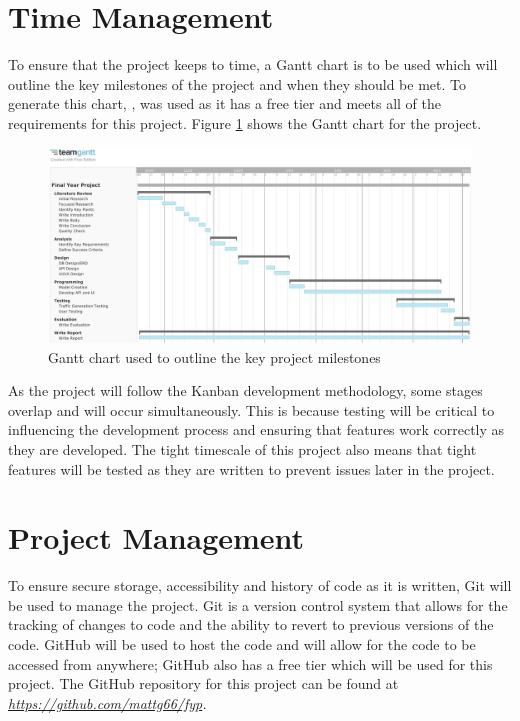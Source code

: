 \section{Time Management}
\label{methodology:time-management}
To ensure that the project keeps to time, a Gantt chart is to be used which will outline the key milestones of the project and when they should be met. To generate this chart, \citep{teamgantt}, was used as it has a free tier and meets all of the requirements for this project. Figure \ref{fig:gantt-chart} shows the Gantt chart for the project.
\begin{figure}[H]
    \centering
    \includegraphics[scale=0.2]{images/gantt-chart.png}
    \caption{Gantt chart used to outline the key project milestones}
    \label{fig:gantt-chart}
\end{figure}
As the project will follow the Kanban development methodology, some stages overlap and will occur simultaneously. This is because testing will be critical to influencing the development process and ensuring that features work correctly as they are developed. The tight timescale of this project also means that tight features will be tested as they are written to prevent issues later in the project.
\section{Project Management}
\label{methodology:project-management}
To ensure secure storage, accessibility and history of code as it is written, Git will be used to manage the project. Git is a version control system that allows for the tracking of changes to code and the ability to revert to previous versions of the code. GitHub will be used to host the code and will allow for the code to be accessed from anywhere; GitHub also has a free tier which will be used for this project. The GitHub repository for this project can be found at \it{\url{https://github.com/mattg66/fyp}}.